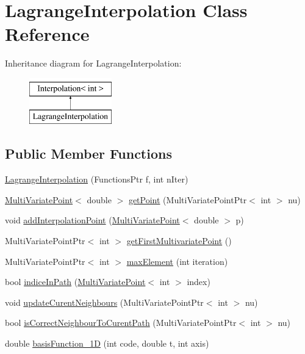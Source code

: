 \hypertarget{class_lagrange_interpolation}{}\section{Lagrange\+Interpolation Class Reference}
\label{class_lagrange_interpolation}
Inheritance diagram for Lagrange\+Interpolation\+:\begin{figure}[H]
\begin{center}
\leavevmode
\includegraphics[height=2.000000cm]{class_lagrange_interpolation}
\end{center}
\end{figure}
\subsection*{Public Member Functions}
\begin{DoxyCompactItemize}
\item 
\hyperlink{class_lagrange_interpolation_a706178734a56c65a34c3437fa90aadd5}{Lagrange\+Interpolation} (Functions\+Ptr f, int n\+Iter)
\item 
\hyperlink{class_multi_variate_point}{Multi\+Variate\+Point}$<$ double $>$ \hyperlink{class_lagrange_interpolation_a37a0077fbf7dfa02811e4012cea87f05}{get\+Point} (Multi\+Variate\+Point\+Ptr$<$ int $>$ nu)
\item 
void \hyperlink{class_lagrange_interpolation_ae821197c9a472d99e9b7635db24fbf2b}{add\+Interpolation\+Point} (\hyperlink{class_multi_variate_point}{Multi\+Variate\+Point}$<$ double $>$ p)
\item 
Multi\+Variate\+Point\+Ptr$<$ int $>$ \hyperlink{class_lagrange_interpolation_a6d491cb766b505eee8d65038a6ff6e02}{get\+First\+Multivariate\+Point} ()
\item 
Multi\+Variate\+Point\+Ptr$<$ int $>$ \hyperlink{class_lagrange_interpolation_ac4c9a2d839db489c85ac8818b4abc777}{max\+Element} (int iteration)
\item 
bool \hyperlink{class_lagrange_interpolation_a4e86ab1204fa39cd83b6de4bba621203}{indice\+In\+Path} (\hyperlink{class_multi_variate_point}{Multi\+Variate\+Point}$<$ int $>$ index)
\item 
void \hyperlink{class_lagrange_interpolation_a1e263cf7d5f4ac2272e589a563a53223}{update\+Curent\+Neighbours} (Multi\+Variate\+Point\+Ptr$<$ int $>$ nu)
\item 
bool \hyperlink{class_lagrange_interpolation_ab964d7da47797afd51edf7c82365a17b}{is\+Correct\+Neighbour\+To\+Curent\+Path} (Multi\+Variate\+Point\+Ptr$<$ int $>$ nu)
\item 
double \hyperlink{class_lagrange_interpolation_a138b1d9afd24ab2e21e8c01dac82880c}{basis\+Function\+\_\+1D} (int code, double t, int axis)
\end{DoxyCompactItemize}
